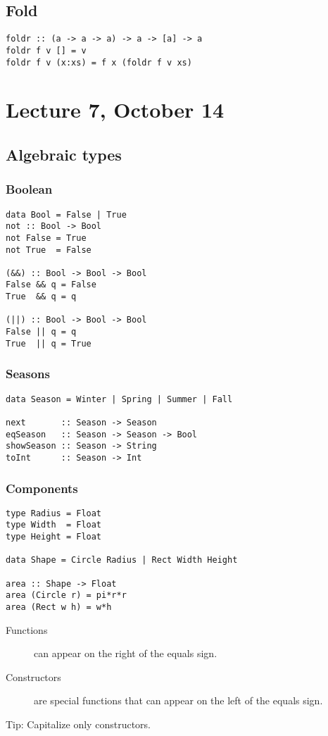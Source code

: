 \documentclass{article}
\begin{document}
\subsection{Fold}
\begin{verbatim}
foldr :: (a -> a -> a) -> a -> [a] -> a
foldr f v [] = v
foldr f v (x:xs) = f x (foldr f v xs)
\end{verbatim}
\section{Lecture 7, October 14}
\subsection{Algebraic types}
\subsubsection{Boolean}
\begin{verbatim}
data Bool = False | True
not :: Bool -> Bool
not False = True
not True  = False

(&&) :: Bool -> Bool -> Bool
False && q = False
True  && q = q

(||) :: Bool -> Bool -> Bool
False || q = q
True  || q = True
\end{verbatim}
\subsubsection{Seasons}
\begin{verbatim}
data Season = Winter | Spring | Summer | Fall

next       :: Season -> Season
eqSeason   :: Season -> Season -> Bool
showSeason :: Season -> String
toInt      :: Season -> Int
\end{verbatim}
\subsubsection{Components}
\begin{verbatim}
type Radius = Float
type Width  = Float
type Height = Float

data Shape = Circle Radius | Rect Width Height

area :: Shape -> Float
area (Circle r) = pi*r*r
area (Rect w h) = w*h
\end{verbatim}
\begin{description}
    \item[Functions] can appear on the right of the equals sign.
    \item[Constructors] are special functions that can appear on the left of the equals sign.
\end{description} 
Tip: Capitalize only constructors.
\end{document}
